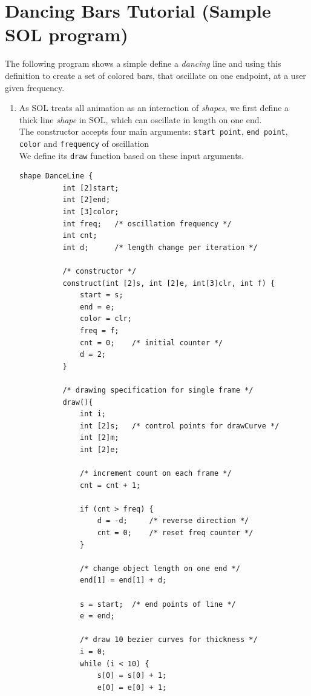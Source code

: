 \documentclass[letterpaper,12pt]{report}
\begin{document}
  \section{Dancing Bars Tutorial (Sample SOL program)}
  The following program shows a simple define a \textit{dancing} line and using this definition to create a set of colored bars, that oscillate on one endpoint, at a user given frequency.
  \begin{enumerate}
    \itemsep 0em
    \item As SOL treats all animation as an interaction of \textit{shapes}, we first define a thick line \textit{shape} in SOL, which can oscillate in length on one end.\\
    The constructor accepts four main arguments: \texttt{start point}, \texttt{end point}, \texttt{color} and \texttt{frequency} of oscillation\\
    We define its \texttt{draw} function based on these input arguments.\\

    \begin{lstlisting}[style=sol, aboveskip=1pt]
      shape DanceLine {
          int [2]start;
          int [2]end;
          int [3]color;
          int freq;   /* oscillation frequency */
          int cnt;
          int d;      /* length change per iteration */

          /* constructor */
          construct(int [2]s, int [2]e, int[3]clr, int f) {
              start = s;
              end = e;
              color = clr; 
              freq = f;   
              cnt = 0;    /* initial counter */
              d = 2;  
          }

          /* drawing specification for single frame */
          draw(){
              int i;
              int [2]s;   /* control points for drawCurve */
              int [2]m;
              int [2]e;

              /* increment count on each frame */
              cnt = cnt + 1;

              if (cnt > freq) {
                  d = -d;     /* reverse direction */
                  cnt = 0;    /* reset freq counter */
              }

              /* change object length on one end */
              end[1] = end[1] + d;

              s = start;  /* end points of line */
              e = end;

              /* draw 10 bezier curves for thickness */
              i = 0;
              while (i < 10) {
                  s[0] = s[0] + 1;
                  e[0] = e[0] + 1;


\end{lstlisting}
\end{enumerate}
\end{document}
